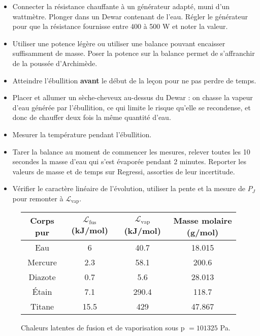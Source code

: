 \documentclass[11pt,a4paper]{report}
\begin{document}
\begin{itemize}
	\item Connecter la résistance chauffante à un générateur adapté, muni d'un wattmètre. Plonger 			dans un Dewar contenant de l'eau. Régler le générateur pour que la résistance fournisse 			entre 400 à 500 W et noter la valeur.
	\item Utiliser une potence légère ou utiliser une balance pouvant encaisser suffisamment de 			masse. Poser la potence sur la balance permet de s'affranchir de la poussée d'Archimède.
	\item Atteindre l'ébullition \textbf{avant} le début de la leçon pour ne pas perdre de temps.
	\item Placer et allumer un sèche-cheveux au-dessus du Dewar : on chasse la vapeur d'eau générée 		par l'ébullition, ce qui limite le risque qu'elle se recondense, et donc de chauffer deux 			fois la même quantité d'eau.
	\item Mesurer la température pendant l'ébullition.
	\item Tarer la balance au moment de commencer les mesures, relever toutes les 10 secondes la 			masse d'eau qui s'est évaporée pendant 2 minutes. Reporter les valeurs de masse et de temps 		sur Regressi, assorties de leur incertitude. 
	\item Vérifier le caractère linéaire de l'évolution, utiliser la pente et la mesure de $P_J$ 			pour remonter à $\mathcal{L}_\text{vap}$.\\ 
\end{itemize}

\begin{figure}
	\begin{center}
		\begin{tabular}{|c|c|c|c|}
			\hline
			Corps pur & $\mathcal{L}_\text{fus}$ (kJ/mol) 
				& $\mathcal{L}_\text{vap}$ (kJ/mol) & Masse molaire (g/mol)\\
			\hline
			Eau & 6 & 40.7 & 18.015\\
			\hline
			Mercure & 2.3 & 58.1 & 200.6\\
			\hline
			Diazote & 0.7 & 5.6 & 28.013\\
			\hline
			Étain & 7.1 & 290.4 & 118.7\\
			\hline
			Titane & 15.5 & 429 & 47.867\\
			\hline
		\end{tabular}
	\end{center}
	\label{tab:chaleurlat}
	\caption{Chaleurs latentes de fusion et de vaporisation sous p $= 101325$ Pa.}
\end{figure}
\end{document}
